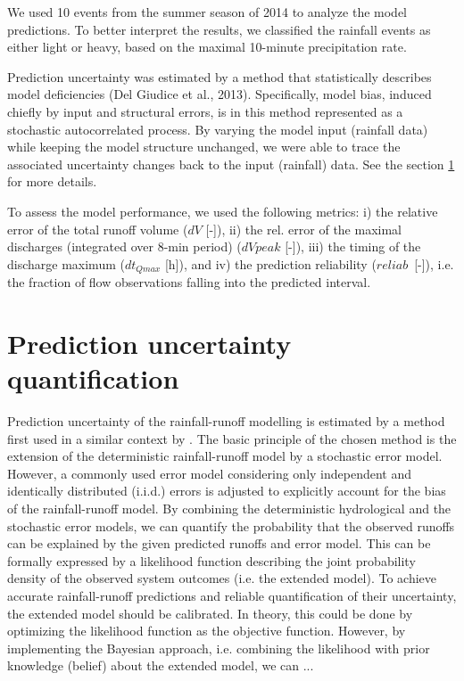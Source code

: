 \documentclass{ctuthesis}\usepackage[]{graphicx}\usepackage[]{color}
\begin{document}
We used 10 events from the summer season of 2014 to analyze the model predictions. To better interpret the results, we classified the rainfall events as either light or heavy, based on the maximal 10-minute precipitation rate. 

Prediction uncertainty was estimated by a method that statistically describes model deficiencies (Del Giudice et al., 2013). Specifically, model bias, induced chiefly by input and structural errors, is in this method represented as a stochastic autocorrelated process. By varying the model input (rainfall data) while keeping the model structure unchanged, we were able to trace the associated uncertainty changes back to the input (rainfall) data. See the section \ref{paperIUnc} for more details.

To assess the model performance, we used the following metrics: i) the relative error of the total runoff volume ($dV$ [-]), ii) the rel. error of the maximal discharges (integrated over 8-min period) ($dVpeak$ [-]), iii) the timing of the discharge maximum ($dt_{Qmax}$ [h]), and iv) the prediction reliability ($reliab$~[-]), i.e. the fraction of flow observations falling into the predicted interval.


\section{Prediction uncertainty quantification} \label{paperIUnc}

Prediction uncertainty of the rainfall-runoff modelling is estimated by a method first used in a similar context by \cite{giudice2013improving}. The basic principle of the chosen method is the extension of the deterministic rainfall-runoff model by a stochastic error model. However, a commonly used error model considering only independent and identically distributed (i.i.d.) errors is adjusted to explicitly account for the bias of the rainfall-runoff model. By combining the deterministic hydrological and the stochastic error models, we can quantify the probability that the observed runoffs can be explained by the given predicted runoffs and error model. This can be formally expressed by a likelihood function describing the joint probability density of the observed system outcomes (i.e. the extended model). To achieve accurate rainfall-runoff predictions and reliable quantification of their uncertainty, the extended model should be calibrated. In theory, this could be done by optimizing the likelihood function as the objective function. However, by implementing the Bayesian approach, i.e. combining the likelihood with prior knowledge (belief) about the extended model, we can ...
\end{document}
